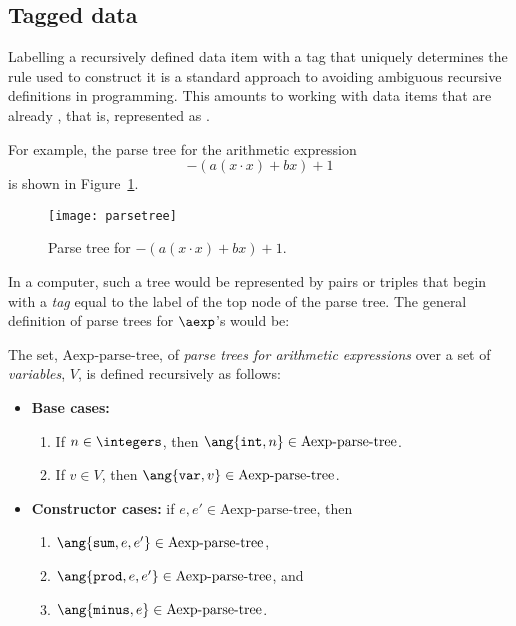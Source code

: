 \begin{editingnotes}

\section{Tagged data}

Labelling a recursively defined data item with a tag that uniquely
determines the rule used to construct it is a standard approach to
avoiding ambiguous recursive definitions in programming.  This
amounts to working with data items that are already , that
is, represented as .

For example, the parse tree for the arithmetic expression
\begin{equation}\label{ax}
-(a(x\cdot x)+ bx) + 1
\end{equation}
is shown in Figure~\ref{fig:parse}.

\begin{figure}[htbp]
\texttt{[image: parsetree]}
\caption{Parse tree for $-(a(x\cdot x)+ bx) + 1$.}
\label{fig:parse}
\end{figure}

In a computer, such a tree would be represented by pairs or triples
that begin with a
\emph{tag} equal to the label of the top node of the parse tree.  
The general definition of parse trees for $\aexp$'s would be:

\newcommand{\paexp}{\text{Aexp-parse-tree}}

\begin{definition}\label{arithparse}
The set, $\paexp$, of \emph{parse trees for arithmetic expressions} 
over a set of
\emph{variables}, $V$, is defined recursively as follows:
\begin{itemize}
\item \textbf{Base cases:}
\begin{enumerate}
\item If $n \in \integers$, then $\ang{\texttt{int}, n} \in \paexp$.
\item If $v \in V$, then $\ang{\texttt{var}, v} \in \paexp$.
\end{enumerate}
\item \textbf{Constructor cases:} if $e,e' \in \paexp$, then
\begin{enumerate}
\item $\ang{\texttt{sum}, e, e'} \in \paexp$,
\item $\ang{\texttt{prod}, e, e'} \in \paexp$, and
\item $\ang{\texttt{minus}, e} \in \paexp$.
\end{enumerate}
\end{itemize}
\end{definition}


\end{editingnotes}
